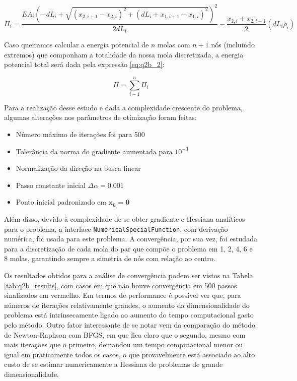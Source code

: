\documentclass[10pt, a4paper]{article}
\begin{document}
\begin{equation}\label{eq:q2b_1}
  \Pi_i = \frac{EA_{i} \left(- dL_{i} + \sqrt{(x_{2,i+1}-x_{2,i})^{2} + \left(dL_{i} + x_{1,i+1}-x_{1,i}\right)^{2}}\right)^{2}}{2dL_{i}}  - \frac{x_{2,i}+x_{2,i+1}}{2} \left(dL_{i} \rho_{i}\right)
\end{equation}

Caso queiramos calcular a energia potencial de $n$ molas com $n+1$ nós (incluindo extremos) que componham a totalidade
da nossa mola discretizada, a energia potencial total será dada pela expressão \ref{eq:q2b_2}:

\begin{equation}\label{eq:q2b_2}
  \Pi = \sum_{i-1}^n \Pi_i
\end{equation}

Para a realização desse estudo e dada a complexidade crescente do problema, algumas alterações nos parâmetros
de otimização foram feitas:

\begin{itemize}
  \item Número máximo de iterações foi para 500
  \item Tolerância da norma do gradiente aumentada para $10^{-3}$
  \item Normalização da direção na busca linear
  \item Passo constante inicial $\Delta\alpha = 0.001$
  \item Ponto inicial padronizado em $\mathbf{x_0} = \mathbf{0}$
\end{itemize}

Além disso, devido à complexidade de se obter gradiente e Hessiana analíticos para o problema, a interface {\tt NumericalSpecialFunction},
com derivação numérica, foi usada para este problema. A convergência, por sua vez, foi estudada para a discretização de cada mola do par que
compõe o problema em 1, 2, 4, 6 e 8 molas, garantindo sempre a simetria de nós com relação ao centro.

Os resultados obtidos para a análise de convergência podem ser vistos na Tabela \ref{tab:q2b_results}, com casos em que não houve convergência
em 500 passos sinalizados em vermelho. Em termos de performance é possível ver que, para números de iterações relativamente grandes, o aumento
da dimensionalidade do problema está intrinsecamente ligado ao aumento do tempo computacional gasto pelo método. Outro fator interessante de
se notar vem da comparação do método de Newton-Raphson com BFGS, em que fica claro que o segundo, mesmo com mais iterações que o primeiro, demandou
um tempo computacional menor ou igual em praticamente todos os casos, o que provavelmente está associado ao alto custo de se estimar numericamente a Hessiana
de problemas de grande dimensionalidade.
\end{document}
